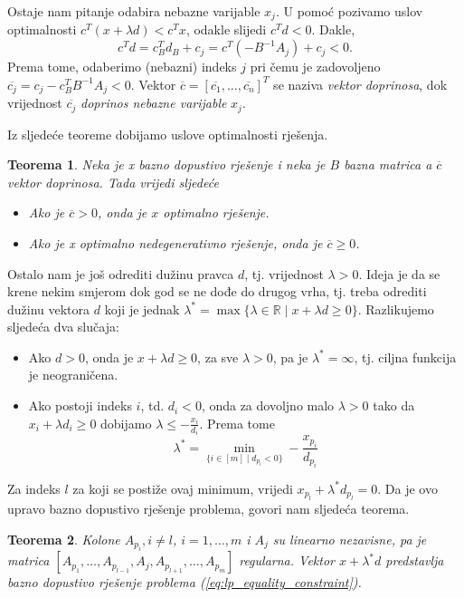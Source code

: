 \documentclass[a4paper, utf8, 11pt, colorlinks]{book}
\newtheorem{thm}{Teorema}
\begin{document}
 Ostaje nam pitanje odabira nebazne varijable $x_j$. U pomoć pozivamo uslov optimalnosti $c^T ( x + \lambda d ) < c^T x $, odakle slijedi $c^T d < 0$.  Dakle, $$c^T d = c_B^T d_B + c_j = c^T ( - B^{-1} A_j ) + c_j < 0.$$
 Prema tome, odaberimo (nebazni) indeks $j$ pri čemu je zadovoljeno $ \overline{c_j} = c_j - c_B^T B^{-1}A_j < 0$. Vektor $\overline{c}=[\overline{c_1}, \ldots, \overline{c_n}]^T$ se naziva \emph{vektor doprinosa}, dok vrijednost $\overline{c_j}$ \emph{doprinos nebazne varijable} $x_j$. 
 
Iz sljedeće teoreme dobijamo uslove optimalnosti rješenja.

\begin{thm}
  Neka je x bazno dopustivo rješenje i neka je $B$ bazna matrica a $\overline{c}$ vektor doprinosa. Tada vrijedi sljedeće
  \begin{itemize}
      \item Ako je $\overline{c} >0$, onda je $x$ optimalno rješenje.
      \item Ako je x optimalno nedegenerativno rješenje, onda je $\overline{c} \geq 0$.
  \end{itemize}
\end{thm}

Ostalo nam je još odrediti dužinu   pravca $d$, tj. vrijednost $\lambda>0$. Ideja je da se krene nekim smjerom dok god se ne dođe do drugog vrha, tj. treba odrediti dužinu vektora $d$ koji je jednak $\lambda^* = \max \{ \lambda \in \mathbb{R} \mid x + \lambda d \geq 0 \}$. Razlikujemo sljedeća dva slučaja:
\begin{itemize}
    \item Ako $d >0$, onda je $  x + \lambda d \geq 0$, za sve $\lambda > 0$, pa je $\lambda^* = \infty$, tj. ciljna funkcija je neograničena.
    \item Ako postoji indeks $i$, td. $d_i < 0$, onda za dovoljno malo $\lambda>0$ tako da $x_i + \lambda d_i \geq 0$ dobijamo $\lambda \leq -\frac{x_i}{d_i}$. Prema tome 
    $$ \lambda^* = \min_{ \{i\in [m] \mid d_{p_i} < 0  \}} - \frac{x_{p_i}}{d_{p_i}} $$
\end{itemize}
Za indeks $l$ za koji se postiže ovaj minimum, vrijedi $x_{p_l} + \lambda^* d_{p_l}=0$.
Da je ovo upravo bazno dopustivo rješenje problema, govori nam sljedeća teorema. 
\begin{thm}
    Kolone $A_{p_i}, i\not = l$, $i=1,\ldots,m$ i $A_{j}$ su linearno nezavisne, pa je matrica 
    $[A_{p_1},\ldots, A_{p_{l-1}}, A_j, A_{p_{l+1}}, \ldots, A_{p_m}]$
    regularna. Vektor $x + \lambda^* d$ predstavlja bazno dopustivo rješenje problema (\ref{eq:lp_equality_constraint}). 
\end{thm}
\end{document}
